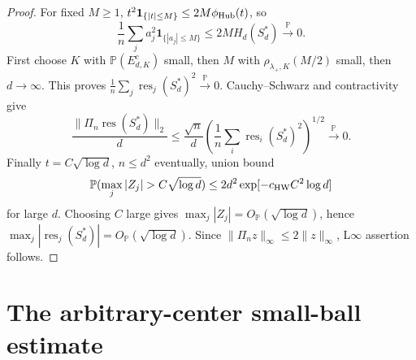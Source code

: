 \documentclass[11pt]{article}
\numberwithin{equation}{section}
\theoremstyle{definition}
\theoremstyle{remark}
\newcommand{\Pp}{\mathbb P}
\newcommand{\1}{\boldsymbol 1}
\newcommand{\PiZero}{\Pi_n}
\newcommand{\res}{\operatorname{res}}
\newcommand{\rvec}{\res}
\newcommand{\rentry}[1]{\res_{#1}}
\begin{document}
\begin{aiblock}
\begin{proof}
  For fixed $M\ge1$, $t^2\mathbf1_{\{|t|\le M\}}\le2M\phi_{\rm Hub}(t)$,
  so
  \[
    \frac1n\sum_j a_j^2\mathbf1_{\{|a_j|\le M\}}\le2M H_d(S_d^*)\xrightarrow{\Pp}0.
  \]
  First choose $K$ with $\Pp(E_{d,K}^c)$ small, then $M$
  with $\rho_{\lambda_+,K}(M/2)$ small, then $d\to\infty$.
  This proves $\frac1n\sum_j\rentry{j}(S_d^*)^2\xrightarrow{\Pp}0$.
  Cauchy--Schwarz and contractivity give
  \[
    \frac{\|\PiZero\rvec(S_d^*)\|_2}{d}\le\frac{\sqrt n}{d}
    \left(\frac1n\sum_i\rentry{i}(S_d^*)^2\right)^{1/2}\xrightarrow{\Pp}0.
  \]
  Finally $t=C\sqrt{\log d}$, $n\le d^2$ eventually, union bound
  \[
    \Pp(\max_j|Z_j|>C\sqrt{\log d})\le2d^2\exp[-c_{\rm HW}C^2\log d]
  \]
  for large $d$. Choosing $C$ large gives
  $\max_j|Z_j|=O_{\Pp}(\sqrt{\log d})$, hence
  $\max_j|\rentry{j}(S_d^*)|=O_{\Pp}(\sqrt{\log d})$. Since
  $\|\PiZero z\|_\infty\le2\|z\|_\infty$, L$\infty$ assertion follows.
\end{proof}
\end{aiblock}



\section{The arbitrary-center small-ball
estimate}\label{expert-determinant-module}
\end{document}
